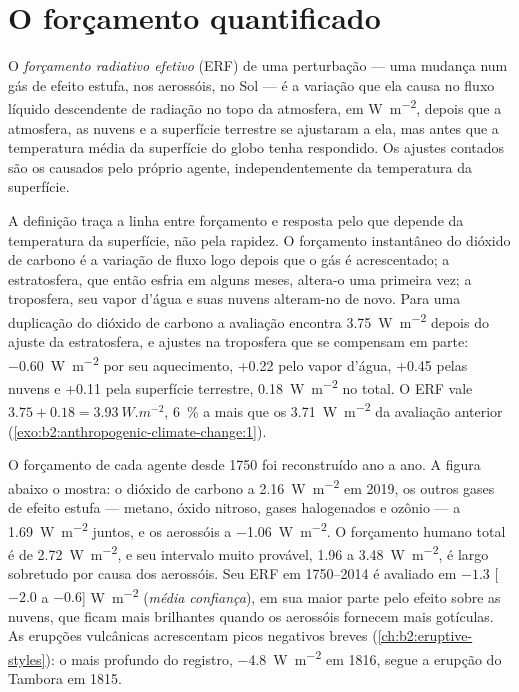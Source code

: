 \section{O forçamento quantificado}\label{sec:b2:anthropogenic-climate-change:forcing}

\begin{definition}\label{def:b2:anthropogenic-climate-change:erf}
O \emph{forçamento radiativo efetivo} (ERF) de uma perturbação
--- uma mudança num gás de efeito estufa, nos aerossóis, no Sol --- é a variação que ela causa no fluxo
líquido descendente de radiação no topo da atmosfera, em \unit{W.m^{-2}}, depois que a atmosfera,
as nuvens e a superfície terrestre se ajustaram a ela, mas antes que a temperatura média da superfície do globo
tenha respondido. Os ajustes contados são os causados pelo próprio agente, independentemente da
temperatura da superfície.
\end{definition}

A definição traça a linha entre forçamento e resposta pelo que depende da temperatura da superfície,
não pela rapidez. O forçamento instantâneo do dióxido de carbono é a variação de fluxo logo
depois que o gás é acrescentado; a estratosfera, que então esfria em alguns meses, altera-o uma primeira vez;
a troposfera, seu vapor d'água e suas nuvens alteram-no de novo. Para uma duplicação do dióxido de
carbono a avaliação encontra \qty{3.75}{W.m^{-2}} depois do ajuste da estratosfera, e
ajustes na troposfera que se compensam em parte: \qty{-0.60}{W.m^{-2}} por seu aquecimento, +0.22
pelo vapor d'água, +0.45 pelas nuvens e +0.11 pela superfície terrestre, \qty{+0.18}{W.m^{-2}} no total.
O ERF vale $3.75 + 0.18 = \qty{3.93}{W.m^{-2}}$, \qty{6}{\percent} a mais que os
\qty{3.71}{W.m^{-2}} da avaliação anterior (\cref{exo:b2:anthropogenic-climate-change:1}).

O forçamento de cada agente desde 1750 foi reconstruído ano a ano. A figura abaixo o mostra:
o dióxido de carbono a \qty{2.16}{W.m^{-2}} em 2019, os outros gases de efeito estufa --- metano,
óxido nitroso, gases halogenados e ozônio --- a \qty{1.69}{W.m^{-2}} juntos, e os
aerossóis a \qty{-1.06}{W.m^{-2}}. O forçamento humano total é de \qty{2.72}{W.m^{-2}}, e seu intervalo muito
provável, 1.96 a \qty{3.48}{W.m^{-2}}, é largo sobretudo por causa dos aerossóis. Seu ERF em
1750--2014 é avaliado em $-1.3$ [$-2.0$ a $-0.6$] \unit{W.m^{-2}} (\emph{média confiança}),
em sua maior parte pelo efeito sobre as nuvens, que ficam mais brilhantes quando os aerossóis fornecem mais gotículas.
As erupções vulcânicas acrescentam picos negativos breves (\cref{ch:b2:eruptive-styles}): o mais profundo do
registro, \qty{-4.8}{W.m^{-2}} em 1816, segue a erupção do Tambora em 1815.

